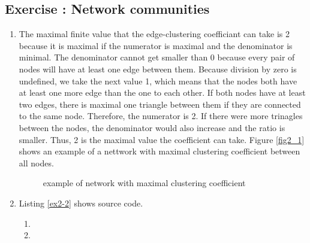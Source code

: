 \documentclass[10pt,a4paper]{article}
\newcommand{\exercise}[1]
{
  \stepcounter{subsection}
  \subsection*{Exercise \thesubsection: #1}

}
\begin{document}
\exercise{Network communities}
\begin{enumerate}
\item The maximal finite value that the edge-clustering coefficiant can take is 2 because it is maximal if the numerator is maximal and the denominator is minimal. The denominator cannot get smaller than 0 because every pair of nodes will have at least one edge between them. Because division by zero is undefined, we take the next value 1, which means that the nodes both have at least one more edge than the one to each other. If both nodes have at least two edges, there is maximal one triangle between them if they are connected to the same node. Therefore, the numerator is 2. If there were more trinagles between the nodes, the denominator would also increase and the ratio is smaller. Thus, 2 is the maximal value the coefficient can take. Figure \ref{fig2_1} shows an example of a nettwork with maximal clustering coefficient between all nodes.\\
\newline
\begin{figure}
\begin{center}
\caption{example of network with maximal clustering coefficient}
\end{center}
\end{figure}

\item Listing \ref{ex2-2} shows source code.
\begin{enumerate}
\item
\item
\end{enumerate}
\end{enumerate}
\end{document}
